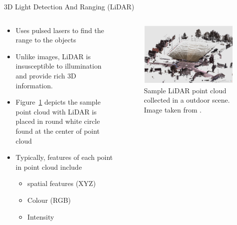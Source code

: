 \documentclass[aspectratio=169]{beamer}
\begin{document}
\begin{frame}{3D Light Detection And Ranging (LiDAR)}
    \begin{columns}
       \begin{column}{0.5\textwidth}
            \begin{itemize}
                \item Uses pulsed lasers to find the range to the objects
                \item Unlike images, LiDAR is insusceptible to illumination and provide rich 3D information.
                \item Figure~\ref{fig:sample_lidar_pc} depicts the sample point cloud with LiDAR is placed in round white circle found at the center of point cloud
                \item Typically, features of each point in point cloud include 
                \begin{itemize}
                    \item spatial features (XYZ)
                    \item Colour (RGB)
                    \item Intensity
                \end{itemize}
            \end{itemize}
       \end{column}
       \begin{column}{0.5\textwidth}
            \begin{figure}
                \centering
                \includegraphics[scale=0.25]{images/sample_LiDAR_PC.jpg}
                \caption{Sample LiDAR point cloud collected in a outdoor scene. Image taken from \cite{hackel2017semantic3d}.}
                \label{fig:sample_lidar_pc}
            \end{figure}
       \end{column}
    \end{columns}
\end{frame}
\end{document}

